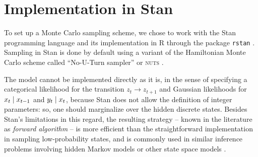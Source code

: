 \documentclass[
  10pt, twocolumn, headings=normal,
  footlines=1, DIV=calc
]{scrartcl}
\begin{document}
\section{Implementation in Stan}
To set up a Monte Carlo sampling scheme, we chose to work with the Stan
\autocite{Stan24} programming language and its implementation in R through the
package \texttt{rstan} \autocite{RStan24}. Sampling in Stan is done by default
using a variant of the Hamiltonian Monte Carlo scheme called \enquote{No-U-Turn
sampler} or \textsc{nuts} \autocite{Carpenter17}.

The model cannot be implemented directly as it is, in the sense of specifying a
categorical likelihood for the transition $z_{t} \to z_{t+1}$ and Gaussian
likelihoods for $x_{t} \;\vert\; x_{t-1}$ and $y_{t} \;\vert\; x_{t}$, because Stan
does not allow the definition of integer parameters: so, one should marginalize
over the hidden discrete states. Besides Stan’s limitations in this regard, the
resulting strategy -- known in the literature as \emph{forward algorithm} -- is
more efficient than the straightforward implementation in sampling
low-probability states, and is commonly used in similar inference problems
involving hidden Markov models or other state space models
\autocite{Damiano2018}.
\end{document}

